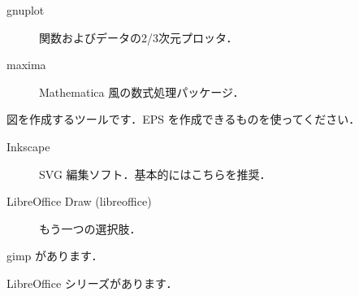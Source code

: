 \documentclass[main]{subfiles}
\begin{document}
\begin{description}[itemsep=1em]
\begin{description}
    \end{description}
    \item[数学関連] 
    \begin{description}
        \item[gnuplot] 関数およびデータの2/3次元プロッタ．
        \item[maxima] Mathematica 風の数式処理パッケージ．
    \end{description}
    \item[ドローツール] 図を作成するツールです．EPS を作成できるものを使ってください．
    \begin{description}
        \item[Inkscape] SVG 編集ソフト．基本的にはこちらを推奨．
        \item[LibreOffice Draw (libreoffice)] もう一つの選択肢．
    \end{description}
    \item[フォトレタッチツール] gimp があります．
    \item[オフィスアプリケーション] LibreOffice シリーズがあります．
\end{description}
\end{document}
